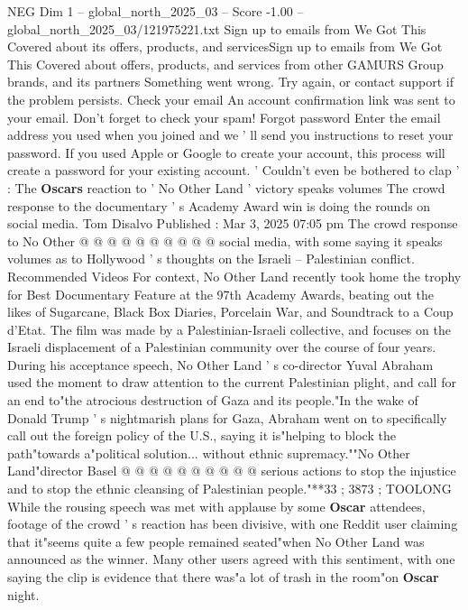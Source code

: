 \begin{textsample}{NEG Dim 1 – global\_north\_2025\_03 – Score -1.00 – global\_north\_2025\_03/121975221.txt}  \label{ex:f1_neg_031}
Sign up to emails from We Got This Covered about its offers, products, and servicesSign up to emails from We Got This Covered about offers, products, and services from other GAMURS Group brands, and its partners Something went wrong.
Try again, or contact support if the problem persists.
Check your email An account confirmation link was sent to your email.
Don't forget to check your spam!
Forgot password Enter the email address you used when you joined and we ' ll send you instructions to reset your password.
If you used Apple or Google to create your account, this process will create a password for your existing account. ' Couldn't even be bothered to clap ' : The \textbf{Oscars} reaction to ' No Other Land ' victory speaks volumes The crowd response to the documentary ' s Academy Award win is doing the rounds on social media.
Tom Disalvo Published : Mar 3, 2025 07:05 pm The crowd response to No Other @ @ @ @ @ @ @ @ @ @ social media, with some saying it speaks volumes as to Hollywood ' s thoughts on the Israeli -- Palestinian conflict.
Recommended Videos For context, No Other Land recently took home the trophy for Best Documentary Feature at the 97th Academy Awards, beating out the likes of Sugarcane, Black Box Diaries, Porcelain War, and Soundtrack to a Coup d'Etat.
The film was made by a Palestinian-Israeli collective, and focuses on the Israeli displacement of a Palestinian community over the course of four years.
During his acceptance speech, No Other Land ' s co-director Yuval Abraham used the moment to draw attention to the current Palestinian plight, and call for an end to"the atrocious destruction of Gaza and its people."In the wake of Donald Trump ' s nightmarish plans for Gaza, Abraham went on to specifically call out the foreign policy of the U.S., saying it is"helping to block the path"towards a"political solution... without ethnic supremacy.""No Other Land"director Basel @ @ @ @ @ @ @ @ @ @ serious actions to stop the injustice and to stop the ethnic cleansing of Palestinian people."**33 ; 3873 ; TOOLONG While the rousing speech was met with applause by some \textbf{Oscar} attendees, footage of the crowd ' s reaction has been divisive, with one Reddit user claiming that it"seems quite a few people remained seated"when No Other Land was announced as the winner.
Many other users agreed with this sentiment, with one saying the clip is evidence that there was"a lot of trash in the room"on \textbf{Oscar} night.

\end{textsample}
